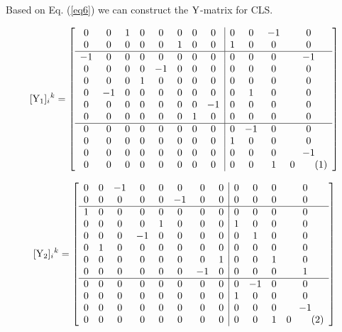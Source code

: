 \documentclass[12pt]{article}
\newcommand\numberthis{\addtocounter{equation}{1}\tag{\theequation}}
\let\bm\relax
\newcommand{\bm}[1]{{\boldsymbol{#1}}}
\begin{document}
Based on Eq. (\ref{eq6}) we can construct the $\bm{\rm{Y}}$-matrix for CLS.

\[[{\bm{\rm Y}_1}]_{i}{}^{k}= 
\left[\begin{array}{cccccccc|cccc}
 0 & 0 & 1 & 0 & 0 & 0 & 0 & 0 & 0 & 0 & -1 & 0 \\
 0 & 0 & 0 & 0 & 0 & 1 & 0 & 0 & 1 & 0 & 0 & 0 \\
  \hline
 -1 & 0 & 0 & 0 & 0 & 0 & 0 & 0 & 0 & 0 & 0 & -1 \\
 0 & 0 & 0 & 0 & -1 & 0 & 0 & 0 & 0 & 0 & 0 & 0 \\
 0 & 0 & 0 & 1 & 0 & 0 & 0 & 0 & 0 & 0 & 0 & 0 \\
 0 & -1 & 0 & 0 & 0 & 0 & 0 & 0 & 0 & 1 & 0 & 0 \\
 0 & 0 & 0 & 0 & 0 & 0 & 0 & -1 & 0 & 0 & 0 & 0 \\
 0 & 0 & 0 & 0 & 0 & 0 & 1 & 0 & 0 & 0 & 0 & 0 \\
  \hline
 0 & 0 & 0 & 0 & 0 & 0 & 0 & 0 & 0 & -1 & 0 & 0 \\
 0 & 0 & 0 & 0 & 0 & 0 & 0 & 0 & 1 & 0 & 0 & 0 \\
 0 & 0 & 0 & 0 & 0 & 0 & 0 & 0 & 0 & 0 & 0 & -1 \\
 0 & 0 & 0 & 0 & 0 & 0 & 0 & 0 & 0 & 0 & 1 & 0 
\numberthis\end{array}\right] \]

\[[{\bm{\rm Y}_2}]_{i}{}^{k}= 
\left[\begin{array}{cccccccc|cccc}
 0 & 0 & -1 & 0 & 0 & 0 & 0 & 0 & 0 & 0 & 0 & 0 \\
 0 & 0 & 0 & 0 & 0 & -1 & 0 & 0 & 0 & 0 & 0 & 0 \\
  \hline
  1 & 0 & 0 & 0 & 0 & 0 & 0 & 0 & 0 & 0 & 0 & 0 \\
 0 & 0 & 0 & 0 & 1 & 0 & 0 & 0 & 1 & 0 & 0 & 0 \\
 0 & 0 & 0 & -1 & 0 & 0 & 0 & 0 & 0 & 1 & 0 & 0 \\
 0 & 1 & 0 & 0 & 0 & 0 & 0 & 0 & 0 & 0 & 0 & 0 \\
 0 & 0 & 0 & 0 & 0 & 0 & 0 & 1 & 0 & 0 & 1 & 0 \\
 0 & 0 & 0 & 0 & 0 & 0 & -1 & 0 & 0 & 0 & 0 & 1 \\
  \hline
 0 & 0 & 0 & 0 & 0 & 0 & 0 & 0 & 0 & -1 & 0 & 0 \\
 0 & 0 & 0 & 0 & 0 & 0 & 0 & 0 & 1 & 0 & 0 & 0 \\
 0 & 0 & 0 & 0 & 0 & 0 & 0 & 0 & 0 & 0 & 0 & -1 \\
 0 & 0 & 0 & 0 & 0 & 0 & 0 & 0 & 0 & 0 & 1 & 0
\numberthis\end{array}\right] \]
\end{document}
